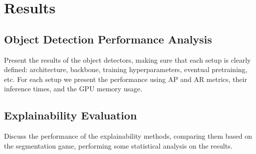 \chapter{Results}
\section{Object Detection Performance Analysis}
Present the results of the object detectors, making sure that each setup is clearly defined: architecture, backbone, training hyperparameters, eventual pretraining, etc.
For each setup we present the performance using AP and AR metrics, their inference times, and the GPU memory usage.

\section{Explainability Evaluation}
Discuss the performance of the explainability methods, comparing them based on the segmentation game, performing some statistical analysis on the results.
